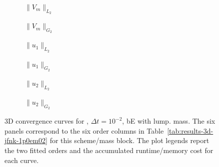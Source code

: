 \begin{figure}[p]
\centering
\begin{subfigure}{0.485\linewidth}
\centering
{}
\caption{$\|V_m\|_{L_2}$}
\label{fig:results-3d-jfnk-1p0em02-backwardeuler-lumped-a}
\end{subfigure}
\hfill
\begin{subfigure}{0.485\linewidth}
\centering
{}
\caption{$\|V_m\|_{G_2}$}
\label{fig:results-3d-jfnk-1p0em02-backwardeuler-lumped-b}
\end{subfigure}
\par\vspace{0.8em}
\begin{subfigure}{0.485\linewidth}
\centering
{}
\caption{$\|u_1\|_{L_2}$}
\label{fig:results-3d-jfnk-1p0em02-backwardeuler-lumped-c}
\end{subfigure}
\hfill
\begin{subfigure}{0.485\linewidth}
\centering
{}
\caption{$\|u_1\|_{G_2}$}
\label{fig:results-3d-jfnk-1p0em02-backwardeuler-lumped-d}
\end{subfigure}
\par\vspace{0.8em}
\begin{subfigure}{0.485\linewidth}
\centering
{}
\caption{$\|u_2\|_{L_2}$}
\label{fig:results-3d-jfnk-1p0em02-backwardeuler-lumped-e}
\end{subfigure}
\hfill
\begin{subfigure}{0.485\linewidth}
\centering
{}
\caption{$\|u_2\|_{G_2}$}
\label{fig:results-3d-jfnk-1p0em02-backwardeuler-lumped-f}
\end{subfigure}
\caption{3D convergence curves for , $\Delta t=10^{-2}$, bE with lump. mass. The six panels correspond to the six order columns in Table~\ref{tab:results-3d-jfnk-1p0em02} for this scheme/mass block. The plot legends report the two fitted orders and the accumulated runtime/memory cost for each curve.}
\label{fig:results-3d-jfnk-1p0em02-backwardeuler-lumped}
\end{figure}
\FloatBarrier

